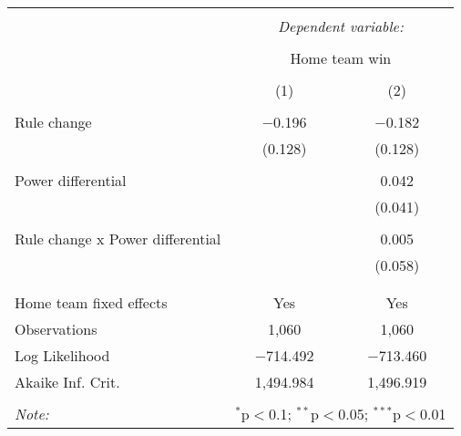 
\begin{table}[!htbp] \centering 
  \caption{} 
  \label{} 
\begin{tabular}{@{\extracolsep{5pt}}lcc} 
\\[-1.8ex]\hline 
\hline \\[-1.8ex] 
 & \multicolumn{2}{c}{\textit{Dependent variable:}} \\ 
\cline{2-3} 
\\[-1.8ex] & \multicolumn{2}{c}{Home team win} \\ 
\\[-1.8ex] & (1) & (2)\\ 
\hline \\[-1.8ex] 
 Rule change & $-$0.196 & $-$0.182 \\ 
  & (0.128) & (0.128) \\ 
  & & \\ 
 Power differential &  & 0.042 \\ 
  &  & (0.041) \\ 
  & & \\ 
 
                               Rule change x Power differential &  & 0.005 \\ 
  &  & (0.058) \\ 
  & & \\ 
\hline \\[-1.8ex] 
Home team fixed effects & Yes & Yes \\ 
Observations & 1,060 & 1,060 \\ 
Log Likelihood & $-$714.492 & $-$713.460 \\ 
Akaike Inf. Crit. & 1,494.984 & 1,496.919 \\ 
\hline 
\hline \\[-1.8ex] 
\textit{Note:}  & \multicolumn{2}{r}{$^{*}$p$<$0.1; $^{**}$p$<$0.05; $^{***}$p$<$0.01} \\ 
\end{tabular} 
\end{table} 
